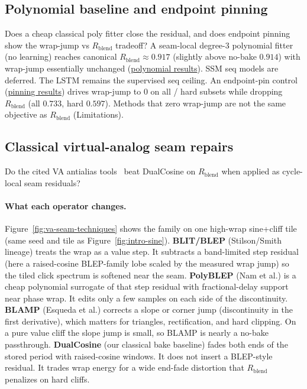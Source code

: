 \subsection{Polynomial baseline and endpoint pinning}
\label{sec:poly-jump}

Does a cheap classical poly fitter close the residual, and does endpoint pinning show the wrap-jump vs $R_{\mathrm{blend}}$ tradeoff?
A seam-local degree-3 polynomial fitter (no learning) reaches canonical $R_{\mathrm{blend}}\approx 0.917$ (slightly above no-bake $0.914$) with wrap-jump essentially unchanged (\href{https://github.com/reeldemo/denoise-opt-meta/blob/master/paper/Unsupervised_Wrap-Discontinuity_Repair_in_Wavetable_Synthesis_via_Hybrid_GA-PPO_Meta-Search_v12/figures/poly_baseline.json}{polynomial results}).
SSM seq models are deferred. The LSTM remains the supervised seq ceiling.
An endpoint-pin control (\href{https://github.com/reeldemo/denoise-opt-meta/blob/master/paper/Unsupervised_Wrap-Discontinuity_Repair_in_Wavetable_Synthesis_via_Hybrid_GA-PPO_Meta-Search_v12/figures/jump_control.json}{pinning results}) drives wrap-jump to $0$ on all / hard subsets while dropping $R_{\mathrm{blend}}$ (all $0.733$, hard $0.597$).
Methods that zero wrap-jump are not the same objective as $R_{\mathrm{blend}}$ (Limitations).

\subsection{Classical virtual-analog seam repairs}
\label{sec:va-seam-baselines}

Do the cited VA antialias tools~\cite{stilson1996,nam2009polyblep,esqueda2016blamp} beat DualCosine on $R_{\mathrm{blend}}$ when applied as cycle-local seam residuals?

\paragraph{What each operator changes.}
Figure~\ref{fig:va-seam-techniques} shows the family on one high-wrap sine{+}cliff tile (same seed and tile as Figure~\ref{fig:intro-sine}).
\textbf{BLIT/BLEP} (Stilson/Smith lineage) treats the wrap as a value step.
It subtracts a band-limited step residual (here a raised-cosine BLEP-family lobe scaled by the measured wrap jump) so the tiled click spectrum is softened near the seam.
\textbf{PolyBLEP} (Nam et al.) is a cheap polynomial surrogate of that step residual with fractional-delay support near phase wrap.
It edits only a few samples on each side of the discontinuity.
\textbf{BLAMP} (Esqueda et al.) corrects a slope or corner jump (discontinuity in the first derivative), which matters for triangles, rectification, and hard clipping.
On a pure value cliff the slope jump is small, so BLAMP is nearly a no-bake passthrough.
\textbf{DualCosine} (our classical bake baseline) fades both ends of the stored period with raised-cosine windows.
It does not insert a BLEP-style residual.
It trades wrap energy for a wide end-fade distortion that $R_{\mathrm{blend}}$ penalizes on hard cliffs.

